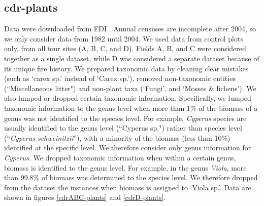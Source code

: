 \documentclass[11pt, oneside]{article}
\begin{document}
\subsection {cdr-plants}
Data were downloaded from EDI \citep{cdr-plants}.
Annual censuses are incomplete after 2004, so we only consider data from 1982 until 2004. 
We used data from control plots only, from all four sites (A, B, C, and D). 
Fields A, B, and C were considered together as a single dataset, while D was considered a separate dataset because of its unique fire history.
We prepared taxonomic data by cleaning clear mistakes (such as `carex sp.' instead of `Carex sp.'), removed non-taxonomic entities (``Miscellaneous litter") and non-plant taxa (`Fungi', and `Mosses \& lichens').
We also lumped or dropped certain taxonomic information. 
Specifically, we lumped taxonomic information to the genus level when more than 1$\%$ of the biomass of a genus was not identified to the species level. 
For example, {\it Cyperus} species are usually identified to the genus level (``Cyperus  sp.") rather than species level (``{\it Cyperus schweinitzii}''), with a minority of the biomass (less than 10$\%$) identified at the specific level. 
We therefore consider only genus information for {\it Cyperus}. 
We dropped taxonomic information when within a certain genus, biomass is identified to the genus level. 
For example, in the genus {\it Viola}, more than 99.8$\%$ of biomass was determined to the species level. We therefore dropped from the dataset the instances when biomass is assigned to `Viola sp.'.
Data are shown in figures \ref{cdrABC-plants} and \ref{cdrD-plants}.
\end{document}
